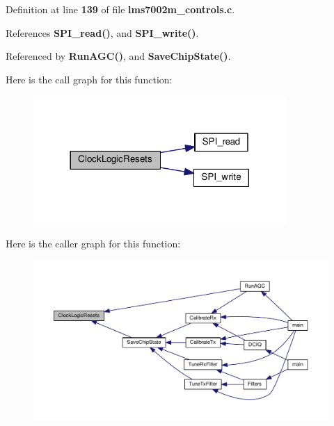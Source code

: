 Definition at line {\bf 139} of file {\bf lms7002m\+\_\+controls.\+c}.



References {\bf S\+P\+I\+\_\+read()}, and {\bf S\+P\+I\+\_\+write()}.



Referenced by {\bf Run\+A\+G\+C()}, and {\bf Save\+Chip\+State()}.



Here is the call graph for this function\+:
\nopagebreak
\begin{figure}[H]
\begin{center}
\leavevmode
\includegraphics[width=272pt]{d3/d86/lms7002m__controls_8h_a3a17e67ffb4d785d7f964c3e4653a670_cgraph}
\end{center}
\end{figure}




Here is the caller graph for this function\+:
\nopagebreak
\begin{figure}[H]
\begin{center}
\leavevmode
\includegraphics[width=350pt]{d3/d86/lms7002m__controls_8h_a3a17e67ffb4d785d7f964c3e4653a670_icgraph}
\end{center}
\end{figure}


